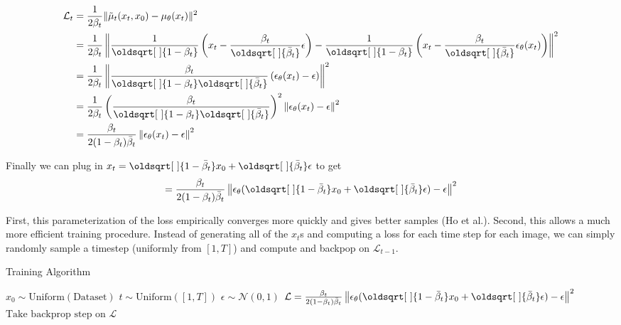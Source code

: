 \documentclass[11pt,dvipsnames]{article}
\renewcommand*{\sqrt}[2][\ ]{\oldsqrt[#1]{#2}}
\begin{document}
\begin{equation*}
\begin{split}
\mathcal{L}_t &= \frac{1}{2\beta_t} \lVert \tilde\mu_t(x_t, x_0) - \mu_\theta(x_t) \rVert^2 \\
&= \frac{1}{2\beta_t} \left\lVert \frac{1}{\sqrt{1 - \beta_t}} \left( x_t - \frac{\beta_t }{\sqrt{\bar\beta_t}} \epsilon \right) - \frac{1}{\sqrt{1 - \beta_t}} \left( x_t - \frac{\beta_t }{\sqrt{\bar\beta_t}} \epsilon_\theta(x_t) \right) \right \rVert^2 \\
&= \frac{1}{2\beta_t} \left\lVert \frac{\beta_t}{\sqrt{1 - \beta_t} \sqrt{\bar\beta_t}} \left( \epsilon_\theta(x_t) - \epsilon \right)\right \rVert^2 \\
&= \frac{1}{2\beta_t} \left( \frac{\beta_t}{\sqrt{1 - \beta_t} \sqrt{\bar\beta_t}} \right)^2 \left \lVert \epsilon_\theta(x_t) - \epsilon \right \rVert^2 \\
&= \frac{\beta_t}{2(1 - \beta_t) \bar\beta_t} \left \lVert \epsilon_\theta(x_t) - \epsilon \right \rVert^2 \\
\end{split}
\end{equation*}

Finally we can plug in $x_t = \sqrt{1 - \bar\beta_t} x_0 + \sqrt{\bar\beta_t} \epsilon$ to get
\begin{equation*}
= \frac{\beta_t}{2(1 - \beta_t) \bar\beta_t} \left \lVert \epsilon_\theta(\sqrt{1 - \bar\beta_t} x_0 + \sqrt{\bar\beta_t} \epsilon) - \epsilon \right \rVert^2 
\end{equation*}

First, this parameterization of the loss empirically converges more quickly and gives better samples (Ho et al.).
Second, this allows a much more efficient training procedure.
Instead of generating all of the $x_t$s and computing a loss for each time step for each image, we can simply
randomly sample a timestep (uniformly from $[1, T]$) and compute and backpop on $\mathcal{L}_{t-1}$.

\begin{algorithm}
\caption{Training Algorithm} \label{alg:training}
\begin{algorithmic}
\State $x_0 \sim \text{Uniform}(\text{Dataset})$
\State $t \sim \text{Uniform}([1, T])$
\State $\epsilon \sim \mathcal{N}(0, 1)$
\State $\mathcal{L} = \frac{\beta_t}{2(1 - \beta_t) \bar\beta_t} \left \lVert \epsilon_\theta(\sqrt{1 - \bar\beta_t} x_0 + \sqrt{\bar\beta_t} \epsilon) - \epsilon \right \rVert^2$
\State $\text{Take backprop step on } \mathcal{L}$
\EndWhile
\end{algorithmic}
\end{algorithm}
\end{document}
